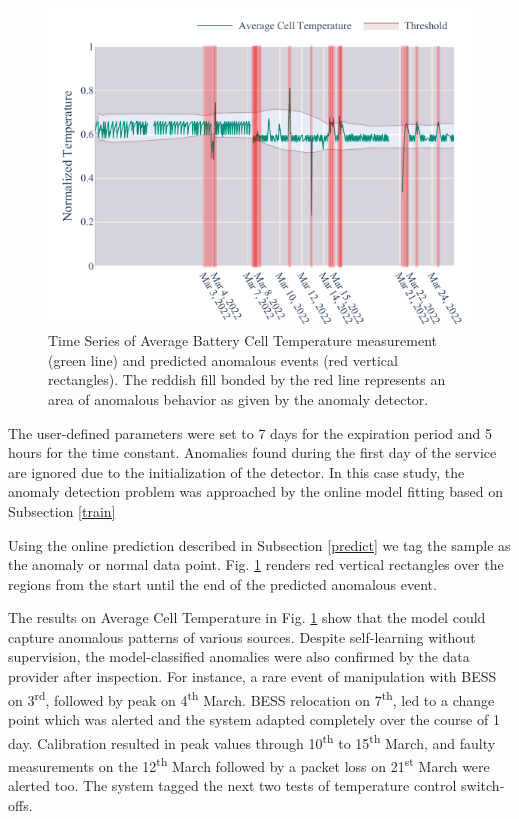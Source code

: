 \begin{figure}[htbp]
 \centerline{\includegraphics{figures/Average_Cell_Temperature_168_hours_sliding_thresh.pdf}}
 \caption{Time Series of Average Battery Cell Temperature measurement (green line) and predicted anomalous events (red vertical rectangles). The reddish fill bonded by the red line represents an area of anomalous behavior as given by the anomaly detector.}
 \label{fig:threshold}
\end{figure}

The user-defined parameters were set to 7 days for the expiration period and 5 hours for the time constant. Anomalies found during the first day of the service are ignored due to the initialization of the detector. In this case study, the anomaly detection problem was approached by the online model fitting based on Subsection \ref{train}

Using the online prediction described in Subsection \ref{predict} we tag the sample as the anomaly or normal data point. Fig. \ref{fig:threshold} renders red vertical rectangles over the regions from the start until the end of the predicted anomalous event. 

The results on Average Cell Temperature in Fig. \ref{fig:threshold} show that the model could capture anomalous patterns of various sources. Despite self-learning without supervision, the model-classified anomalies were also confirmed by the data provider after inspection. For instance, a rare event of manipulation with BESS on 3\textsuperscript{rd}, followed by peak on 4\textsuperscript{th} March. BESS relocation on 7\textsuperscript{th}, led to a change point which was alerted and the system adapted completely over the course of 1 day. Calibration resulted in peak values through 10\textsuperscript{th} to 15\textsuperscript{th} March, and faulty measurements on the 12\textsuperscript{th} March followed by a packet loss on 21\textsuperscript{st} March were alerted too. The system tagged the next two tests of temperature control switch-offs. 


